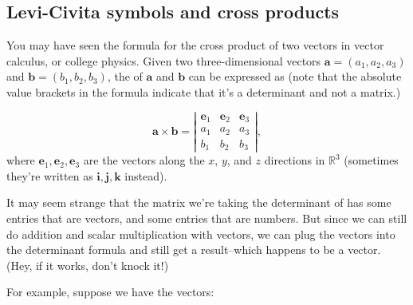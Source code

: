 

\subsection{Levi-Civita symbols and cross products}
\label{subsec:SigmaApp:LeviCivitaAndApp:CrossProducts}

You may have seen the formula for the cross product of two vectors in vector calculus, or college physics. Given two three-dimensional vectors $\textbf{a}=(a_1, a_2, a_3)$ and $\textbf{b}=(b_1, b_2, b_3)$, the  of $\textbf{a}$ and $\textbf{b}$ can be expressed as  (note that the absolute value brackets in the formula  indicate that it's a determinant and not a matrix.)

\[ \textbf{a} \times \textbf{b}=
 \left| \begin{array}{ccc}
\textbf{e}_1 & \textbf{e}_2  & \textbf{e}_3  \\
a_1 & a_2 & a_3 \\
b_1 & b_2 & b_3 \end{array} \right|,\]
where $\textbf{e}_1,  \textbf{e}_2 , \textbf{e}_3$ are the vectors along the $x$, $y$, and $z$ directions  in $\mathbb{R}^3$ (sometimes they're written as $\textbf{i}, \textbf{j}, \textbf{k}$ instead).

It may seem strange that the matrix we're taking the determinant of has some entries that are vectors, and some entries that are numbers. But since we can still do addition and scalar multiplication with vectors, we can plug the vectors into the determinant formula and still get a result--which happens to be a vector. (Hey, if it works, don't knock it!)

For example, suppose we have the vectors:

